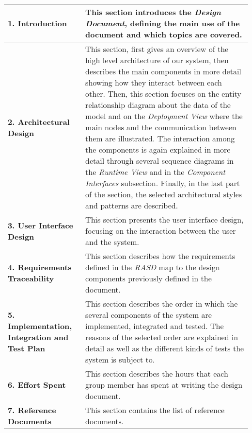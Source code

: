 \begin{center}
\centering
\begin{table}[H]
\centering
\begin{tabular} { p{4cm}  p{10 cm} }
\toprule
\textbf{1. Introduction} & This section introduces the \textit{Design Document}, defining the main use of the document and which topics are covered.                                                                                                                                  \\ \midrule
\textbf{2. Architectural Design} & This section, first gives an overview of the high level architecture of our system, then describes the main components in more detail showing how they interact between each other. Then, this section focuses on the entity relationship diagram about the data of the model and on the \textit{Deployment View} where the main nodes and the communication between them are illustrated. The interaction among the components is again explained in more detail through several sequence diagrams in the \textit{Runtime View} and in the \textit{Component Interfaces} subsection. Finally, in the last part of the section, the selected architectural styles and patterns are described. \\ \midrule
\textbf{3. User Interface Design} &  This section presents the user interface design, focusing on the interaction between the user and the system.  \\ \midrule
\textbf{4. Requirements Traceability}  & This section describes how the requirements defined in the \textit{RASD} map to the design components previously defined in the document.\\ \midrule
\textbf{5. Implementation, Integration and Test Plan} &  This section describes the order in which the several components of the system are implemented, integrated and tested. The reasons of the selected order are explained in detail as well as the different kinds of tests the system is subject to.
\\ \midrule
\textbf {6. Effort Spent} & This section describes the hours that each group member has spent at writing the design document. \\ \midrule
\textbf{7. Reference Documents} & This section contains the list of  reference documents. \\ \bottomrule
\end{tabular}
\end{table}
\clearpage
\end{center}
\clearpage